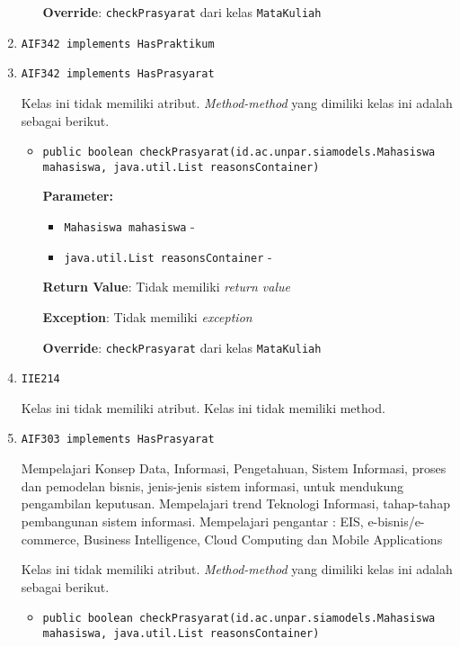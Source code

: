 \documentclass{article}
\begin{document}
\begin{enumerate}
\begin{itemize}
\textbf{Override}: \texttt{checkPrasyarat} dari kelas \texttt{MataKuliah}

\end{itemize}
\item \texttt{AIF342 implements HasPraktikum}

\item \texttt{AIF342 implements HasPrasyarat}



Kelas ini tidak memiliki atribut. \textit{Method-method} yang dimiliki kelas ini adalah sebagai berikut.
\begin{itemize}
\item \texttt{public boolean checkPrasyarat(id.ac.unpar.siamodels.Mahasiswa mahasiswa, java.util.List reasonsContainer)}



\textbf{Parameter:}
\begin{itemize}
\item \texttt{Mahasiswa mahasiswa} - 
\item \texttt{java.util.List reasonsContainer} - 
\end{itemize}
\textbf{Return Value}: Tidak memiliki \textit{return value}

\textbf{Exception}: Tidak memiliki \textit{exception}

\textbf{Override}: \texttt{checkPrasyarat} dari kelas \texttt{MataKuliah}

\end{itemize}
\item \texttt{IIE214}



Kelas ini tidak memiliki atribut. Kelas ini tidak memiliki method. \item \texttt{AIF303 implements HasPrasyarat}

Mempelajari Konsep Data, Informasi, Pengetahuan, Sistem Informasi, proses dan
 pemodelan bisnis, jenis-jenis sistem informasi, untuk mendukung pengambilan
 keputusan. Mempelajari trend Teknologi Informasi, tahap-tahap pembangunan
 sistem informasi. Mempelajari pengantar : EIS, e-bisnis/e-commerce, Business
 Intelligence, Cloud Computing dan Mobile Applications

Kelas ini tidak memiliki atribut. \textit{Method-method} yang dimiliki kelas ini adalah sebagai berikut.
\begin{itemize}
\item \texttt{public boolean checkPrasyarat(id.ac.unpar.siamodels.Mahasiswa mahasiswa, java.util.List reasonsContainer)}




\end{itemize}
\end{enumerate}
\end{document}
